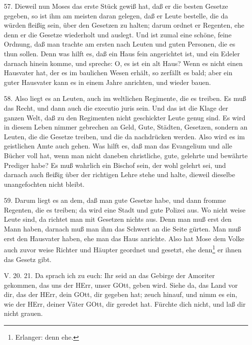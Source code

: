 57. Dieweil nun Moses das erste Stück gewiß hat, daß er die besten Gesetze gegeben, so ist ihm am meisten daran gelegen, daß er Leute bestelle, die da würden fleißig sein, über den Gesetzen zu halten; darum ordnet er Regenten, ehe denn er die Gesetze wiederholt und auslegt. Und ist zumal eine schöne, feine Ordnung, daß man trachte am ersten nach Leuten und guten Personen, die es thun sollen. Denn was hilft es, daß ein Haus fein angerichtet ist, und ein Edeler darnach hinein komme, und spreche: O, es ist ein alt Haus? Wenn es nicht einen Hausvater hat, der es im baulichen Wesen erhält, so zerfällt es bald; aber ein guter Hausvater kann es in einem Jahre anrichten, und wieder bauen.

58. Also liegt es an Leuten, auch im weltlichen Regimente, die es treiben. Es muß das Recht, und dann auch die executio juris sein. Und das ist die Klage der ganzen Welt, daß zu den Regimenten nicht geschickter Leute genug sind. Es wird in diesem Leben nimmer gebrechen an Geld, Gute, Städten, Gesetzen, sondern an Leuten, die die Gesetze treiben, und die da nachdrücken werden. Also wird es im geistlichen Amte auch gehen. Was hilft es, daß man das Evangelium und alle Bücher voll hat, wenn man nicht daneben christliche, gute, gelehrte und bewährte Prediger habe? Es muß wahrlich ein Bischof sein, der wohl gelehrt sei, und darnach auch fleißig über der richtigen Lehre stehe und halte, dieweil dieselbe unangefochten nicht bleibt.

59. Darum liegt es an dem, daß man gute Gesetze habe, und dann fromme Regenten, die es treiben; da wird eine Stadt und gute Polizei aus. Wo nicht weise Leute sind, da richtet man mit Gesetzen nichts aus. Denn man muß erst den Mann haben, darnach muß man ihm das Schwert an die Seite gürten. Man muß erst den Hausvater haben, ehe man das Haus anrichte. Also hat Mose dem Volke auch zuvor weise Richter und Häupter geordnet und gesetzt, ehe denn\footnote{Erlanger: denn ehe.} er ihnen das Gesetz gibt.

\begin{schriftzitat}
V. 20. 21. Da sprach ich zu euch: Ihr seid an das Gebirge der Amoriter gekommen, das uns der HErr, unser GOtt, geben wird. Siehe da, das Land vor dir, das der HErr, dein GOtt, dir gegeben hat; zeuch hinauf, und nimm es ein, wie der HErr, deiner Väter GOtt, dir geredet hat. Fürchte dich nicht, und laß dir nicht grauen.
\end{schriftzitat}

